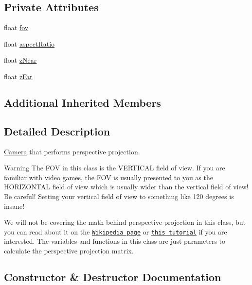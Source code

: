 \subsection*{Private Attributes}
\begin{DoxyCompactItemize}
\item
float \hyperlink{class_perspective_camera_ad693187f75ab5bfc597066364483325c}{fov}
\item
float \hyperlink{class_perspective_camera_ad96660d3109e54fa282955bf66a255eb}{aspect\+Ratio}
\item
float \hyperlink{class_perspective_camera_a11c1dcd1bdeb4bf8294d6272fb4d2695}{z\+Near}
\item
float \hyperlink{class_perspective_camera_af88e6161cd3c818d49e6421f52474a2b}{z\+Far}
\end{DoxyCompactItemize}
\subsection*{Additional Inherited Members}


\subsection{Detailed Description}
\hyperlink{class_camera}{Camera} that performs perspective projection.

\begin{DoxyWarning}{Warning}
The F\+OV in this class is the V\+E\+R\+T\+I\+C\+AL field of view. If you are familiar with video games, the F\+OV is usually presented to you as the H\+O\+R\+I\+Z\+O\+N\+T\+AL field of view which is usually wider than the vertical field of view! Be careful! Setting your vertical field of view to something like 120 degrees is insane!
\end{DoxyWarning}
We will not be covering the math behind perspective projection in this class, but you can read about it on the \href{https://en.wikipedia.org/wiki/3D_projection#Perspective_projection}{\tt Wikipedia page} or \href{http://ogldev.atspace.co.uk/www/tutorial12/tutorial12.html}{\tt this tutorial} if you are interested. The variables and functions in this class are just parameters to calculate the perspective projection matrix.

\subsection{Constructor \& Destructor Documentation}
\hypertarget{class_perspective_camera_adb5624bfee18c9390df3ba0612431124}{}\label{class_perspective_camera_adb5624bfee18c9390df3ba0612431124}
